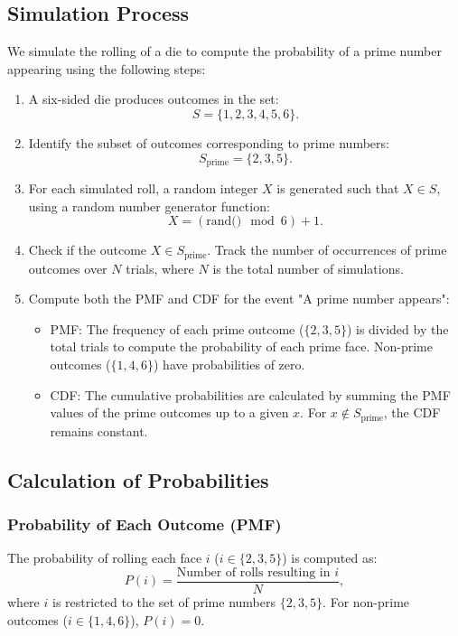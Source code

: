 \documentclass[journal]{IEEEtran}
\begin{document}
\subsection*{Simulation Process}
We simulate the rolling of a die to compute the probability of a prime number appearing using the following steps:
\begin{enumerate}
    \item A six-sided die produces outcomes in the set:
    \[
    S = \{1, 2, 3, 4, 5, 6\}.
    \]
    \item Identify the subset of outcomes corresponding to prime numbers:
    \[
    S_{\text{prime}} = \{2, 3, 5\}.
    \]
    \item For each simulated roll, a random integer \( X \) is generated such that \( X \in S \), using a random number generator function:
    \[
    X = (\text{rand()} \mod 6) + 1.
    \]
    \item Check if the outcome \( X \in S_{\text{prime}} \). Track the number of occurrences of prime outcomes over \( N \) trials, where \( N \) is the total number of simulations.
    \item Compute both the PMF and CDF for the event "A prime number appears":
    \begin{itemize}
        \item PMF: The frequency of each prime outcome (\( \{2, 3, 5\} \)) is divided by the total trials to compute the probability of each prime face. Non-prime outcomes (\( \{1, 4, 6\} \)) have probabilities of zero.
        \item CDF: The cumulative probabilities are calculated by summing the PMF values of the prime outcomes up to a given \( x \). For \( x \notin S_{\text{prime}} \), the CDF remains constant.
    \end{itemize}
\end{enumerate}

\subsection*{Calculation of Probabilities}

\subsubsection*{Probability of Each Outcome (PMF)}
The probability of rolling each face \( i \) (\( i \in \{2, 3, 5\} \)) is computed as:
\[
P(i) = \frac{\text{Number of rolls resulting in } i}{N},
\]
where \( i \) is restricted to the set of prime numbers \( \{2, 3, 5\} \). For non-prime outcomes (\( i \in \{1, 4, 6\} \)), \( P(i) = 0 \).
\end{document}
